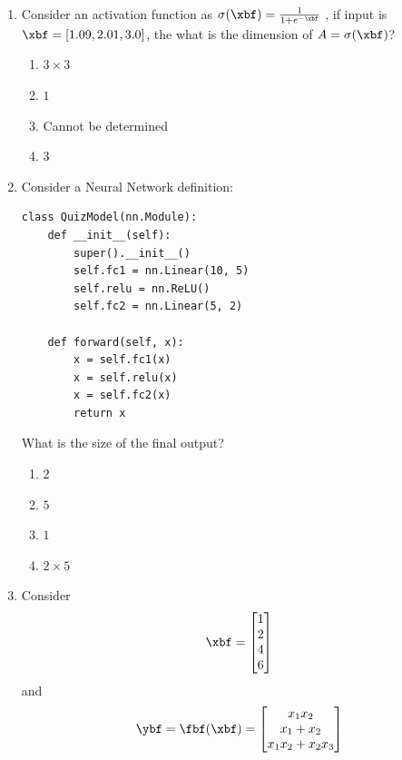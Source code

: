 \documentclass[11pt,letterpaper]{article}
\begin{document}
\begin{tcolorbox}[mcbox]
\begin{enumerate}[label=\textbf{Q\arabic*.}, leftmargin=*, itemsep=16pt]
\item Consider an activation function as $\sigma(\xbf) = \frac{1}{1 + e^{-\xbf}}$ , if input is $\xbf = [1.09, 2.01, 3.0]$, the what is the dimension of $ A = \sigma(\xbf)$?

\begin{enumerate}

\item $3 \times 3$
\item $1$
\item Cannot be determined
\item $3$
\end{enumerate}

\item Consider a Neural Network definition:

          \begin{verbatim}
class QuizModel(nn.Module):
    def __init__(self):
        super().__init__()
        self.fc1 = nn.Linear(10, 5)
        self.relu = nn.ReLU()
        self.fc2 = nn.Linear(5, 2)

    def forward(self, x):
        x = self.fc1(x)
        x = self.relu(x)
        x = self.fc2(x)
        return x
\end{verbatim}

What is the size of the final output?

\begin{enumerate}
\item $2$
\item $5$
\item $1$
\item $2\times 5$
\end{enumerate}


\item Consider
\begin{align*}
\xbf = \begin{bmatrix}
1 \\ 2 \\ 4 \\ 6
\end{bmatrix}
\end{align*}
and 
\begin{align*}
\ybf = \fbf(\xbf) = \begin{bmatrix}
x_1 x_2 \\
x_1 + x_2\\
x_1x_2 + x_2x_3
\end{bmatrix}
\end{align*}


\end{enumerate}
\end{tcolorbox}
\end{document}
